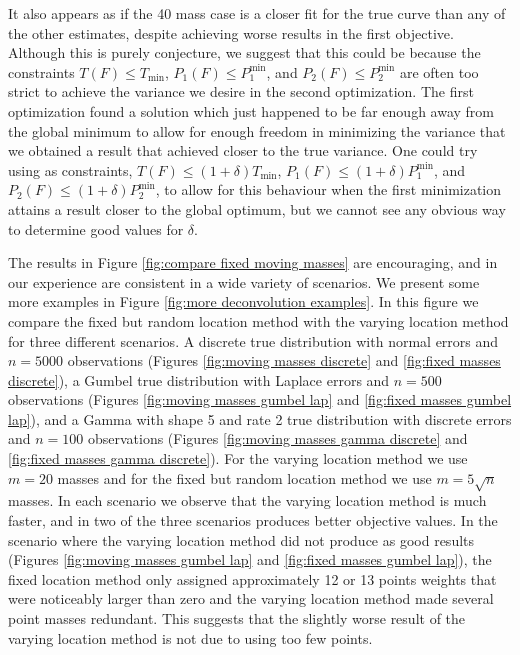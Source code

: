 It also appears as if the 40 mass case is a closer fit for the true curve than any of the other estimates, despite achieving worse results in the first objective. Although this is purely conjecture, we suggest that this could be because the constraints $T(F) \leq T_\mathrm{min}$, $P_1(F) \leq P_1^\mathrm{min}$, and $P_2(F) \leq P_2^\mathrm{min}$ are often too strict to achieve the variance we desire in the second optimization. The first optimization found a solution which just happened to be far enough away from the global minimum to allow for enough freedom in minimizing the variance that we obtained a result that achieved closer to the true variance. One could try using as constraints, $T(F) \leq (1 + \delta) T_\mathrm{min}$, $P_1(F) \leq (1 + \delta) P_1^\mathrm{min}$, and $P_2(F) \leq (1 + \delta) P_2^\mathrm{min}$, to allow for this behaviour when the first minimization attains a result closer to the global optimum, but we cannot see any obvious way to determine good values for $\delta$.

The results in Figure \ref{fig:compare fixed moving masses} are encouraging, and in our experience are consistent in a wide variety of scenarios. We present some more examples in Figure \ref{fig:more deconvolution examples}. 
In this figure we compare the fixed but random location method with the varying location method for three different scenarios. A discrete true distribution with normal errors and $n = 5000$ observations (Figures \ref{fig:moving masses discrete} and \ref{fig:fixed masses discrete}), a Gumbel true distribution with Laplace errors and $n = 500$ observations (Figures \ref{fig:moving masses gumbel lap} and \ref{fig:fixed masses gumbel lap}), and a Gamma with shape 5 and rate 2 true distribution with discrete errors and $n = 100$ observations (Figures \ref{fig:moving masses gamma discrete} and \ref{fig:fixed masses gamma discrete}). For the varying location method we use $m = 20$ masses and for the fixed but random location method we use $m = 5\sqrt{n}$ masses. In each scenario we observe that the varying location method is much faster, and in two of the three scenarios produces better objective values. In the scenario where the varying location method did not produce as good results (Figures \ref{fig:moving masses gumbel lap} and \ref{fig:fixed masses gumbel lap}), the fixed location method only assigned approximately 12 or 13 points weights that were noticeably larger than zero and the varying location method made several point masses redundant. This suggests that the slightly worse result of the varying location method is not due to using too few points.

